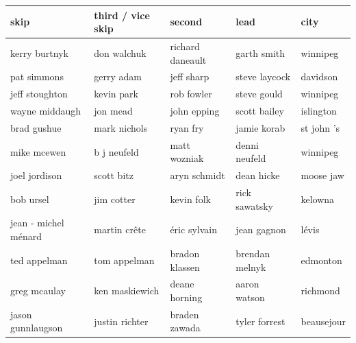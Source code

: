 \documentclass{article}
\begin{document}
\begin{tabular}{lllll}
\toprule
skip & third / vice skip & second & lead & city \\
\midrule
kerry burtnyk & don walchuk & richard daneault & garth smith & winnipeg \\
pat simmons & gerry adam & jeff sharp & steve laycock & davidson \\
jeff stoughton & kevin park & rob fowler & steve gould & winnipeg \\
wayne middaugh & jon mead & john epping & scott bailey & islington \\
brad gushue & mark nichols & ryan fry & jamie korab & st john 's \\
mike mcewen & b j neufeld & matt wozniak & denni neufeld & winnipeg \\
joel jordison & scott bitz & aryn schmidt & dean hicke & moose jaw \\
bob ursel & jim cotter & kevin folk & rick sawatsky & kelowna \\
jean - michel ménard & martin crête & éric sylvain & jean gagnon & lévis \\
ted appelman & tom appelman & bradon klassen & brendan melnyk & edmonton \\
greg mcaulay & ken maskiewich & deane horning & aaron watson & richmond \\
jason gunnlaugson & justin richter & braden zawada & tyler forrest & beausejour \\
\bottomrule
\end{tabular}
\end{document}
